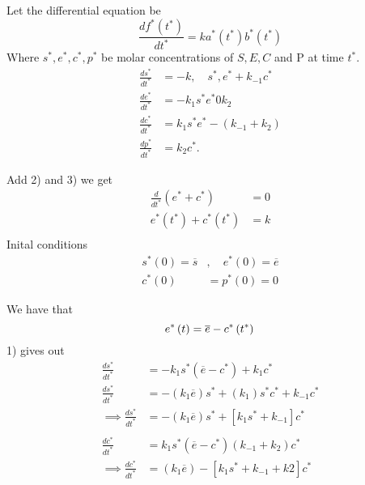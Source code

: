 \documentclass{article}
\theoremstyle{remark}
\begin{document}
\begin{enumerate}[label=(\roman*)]
Let the differential equation be \[
\frac{d f^{*}\left( t^{*}  \right)}{d t^{*}}  = k a^{*} \left( t^{*} \right) b^{*} \left( t^{*} \right)
\] 
Where $s ^{*}, e ^{* } , c ^{*} , p ^{*}$ be molar concentrations of $S, E, C$ and P at time $t ^{*}$. 
\begin{align}
\frac{d s ^{*}}{d t ^{*}}  &= -k, \quad s ^{*}, e ^{*} + k_{-1}c ^{*}  \\
\frac{d e ^{*}}{d t^{*}}  & =  - k_{1} s ^{*} e ^{*} 0 k_{2}  \\
\frac{d c ^{*}}{d t ^{*}}  &= k_{1} s ^{*} e ^{*} - \left( k_{-1} + k_{2} \right) \\
\frac{d p ^{*}}{d t ^{*}} &= k_{2} c ^{*} 
.\end{align}

Add 2) and 3) we get \[
\begin{split}
  \frac{d }{d t ^{*}}  \left( e^{*} + c ^{*} \right) &=  0 \\
  e ^{*} \left( t ^{*} \right) +  c ^{* } \left( t ^{*} \right) &= k \\
\end{split} 
\] 
Inital conditions \[
  \begin{split}
s ^{*}\left( 0 \right) = \overline{s}   & , \quad e ^{*}\left( 0 \right) = \overline{e}  \\
c ^{*}\left( 0 \right)  & = p  ^{*}\left( 0 \right) =0 
  \end{split} 
\] 

We have that \[
e ^{*} \left( t \right) = \overline{e}  - c ^{*}\left( t ^{*} \right) \\
\] 
 1) gives out \[
   \begin{split}
 \frac{d s ^{*}}{d t ^{*}}  &=  - k_{1} s ^{*}\left( \overline{e}  -  c ^{*} \right) + k_{1} c ^{*} \\
  \frac{d s ^{*}}{d t ^{*} }  &=  - \left( k_{1} \overline{e}  \right) s ^{*} + \left( k_{1}  \right) s ^{*} c ^{* } + k_{-1} c ^{*} \\
 \implies  \frac{d s ^{*}}{d t ^{*}}  &= -\left( k_{1} \overline{e}  \right) s ^{*} + \left[ k_{1} s ^{*} + k_{-1} \right] c ^{*} \\
 \\
   \frac{d c^{*}}{d t ^{*} }  &=  k_{1} s ^{*} \left( \overline{e} - c ^{*}  \right) \left( k_{-1} + k_{2} \right) c ^{*}\\
 \implies \frac{d c^{*}}{d t^{*}}  &= \left( k_{1} \overline{e}  \right) - \left[ k_{1} s ^{*} + k_{-1} + k2 \right] c ^{*} \\
   \end{split} 
 \] 


\end{enumerate}
\end{document}
